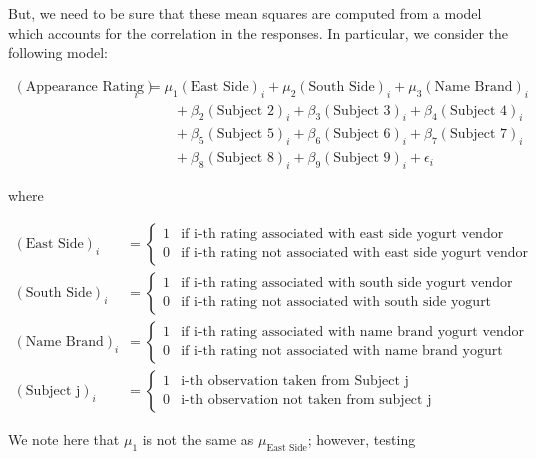 \documentclass[
]{book}
\theoremstyle{plain}
\theoremstyle{mydefn}
\theoremstyle{myexmpl}
\theoremstyle{remark}
\begin{document}
But, we need to be sure that these mean squares are computed from a model which accounts for the correlation in the responses. In particular, we consider the following model:

\[
\begin{aligned}
  (\text{Appearance Rating})_i &= \mu_1 (\text{East Side})_i + \mu_2 (\text{South Side})_i + \mu_3 (\text{Name Brand})_i \\
    &\qquad + \beta_2 (\text{Subject 2})_i + \beta_3 (\text{Subject 3})_i + \beta_4 (\text{Subject 4})_i \\
    &\qquad + \beta_5 (\text{Subject 5})_i + \beta_6 (\text{Subject 6})_i + \beta_7 (\text{Subject 7})_i \\
    &\qquad + \beta_8 (\text{Subject 8})_i + \beta_9 (\text{Subject 9})_i + \epsilon_i
\end{aligned}
\]

where

\[
\begin{aligned}
  (\text{East Side})_i &= \begin{cases}
    1 & \text{if i-th rating associated with east side yogurt vendor} \\
    0 & \text{if i-th rating not associated with east side yogurt vendor}
    \end{cases} \\
  (\text{South Side})_i &= \begin{cases}
    1 & \text{if i-th rating associated with south side yogurt vendor} \\
    0 & \text{if i-th rating not associated with south side yogurt vendor}
    \end{cases} \\
  (\text{Name Brand})_i &= \begin{cases}
    1 & \text{if i-th rating associated with name brand yogurt vendor} \\
    0 & \text{if i-th rating not associated with name brand yogurt vendor}
    \end{cases} \\
  (\text{Subject j})_i &= \begin{cases}
  1 & \text{i-th observation taken from Subject j} \\
  0 & \text{i-th observation not taken from subject j}
  \end{cases}
\end{aligned}
\]

We note here that \(\mu_1\) is not the same as \(\mu_{\text{East Side}}\); however, testing
\end{document}
